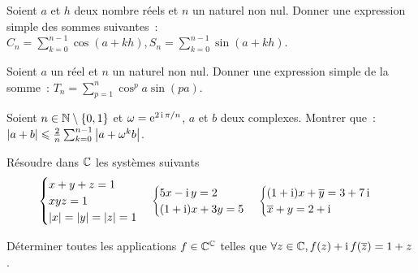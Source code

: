 \begin{exercice}
    Soient \(a\) et \(h\) deux nombre réels et \(n\) un naturel non nul. Donner 
    une expression simple des sommes suivantes~: \( C_n = \sum_{k=0}^{n-1} 
    \cos(a+kh), S_n = \sum_{k=0}^{n-1} \sin(a+kh)\).
\end{exercice}
\begin{exercice}
    Soient \(a\) un réel et \(n\) un naturel non nul. Donner une expression 
    simple de la somme~: \(T_n = \sum_{p=1}^n \cos^p a \sin(pa)\).
\end{exercice}
\begin{exercice}
    Soient \(n \in \mathbb{N}\setminus\{0,1\}\) et \(\omega = \operatorname{e}^{2\operatorname{i}\pi/n}\), \(a\) et 
    \(b\) deux complexes. Montrer que~: \(\left\lvert a+b\right\rvert \leqslant \frac{2}{n} 
    \sum_{k=0}^{n-1} \left\lvert a+\omega^k b\right\rvert\).
\end{exercice}
\begin{exercice}
    Résoudre dans \(\mathbb{C}\) les systèmes suivants
    \begin{equation}
        \begin{cases} x+y+z=1 \\ xyz=1 \\ \left\lvert x\right\rvert=\left\lvert y\right\rvert=\left\lvert z\right\rvert=1 \end{cases}
        \begin{cases} 5x-\operatorname{i}{}y=2 \\ (1+\operatorname{i})x+3y=5 \end{cases}
        \begin{cases} (1+\operatorname{i})x+\overline{y} = 3+7\operatorname{i} \\\overline{x}+y=2+\operatorname{i}\end{cases}
    \end{equation}
\end{exercice}
\begin{exercice}
    Déterminer toutes les applications \(f \in \mathbb{C}^{\mathbb{C}}\) telles que \(\forall z 
    \in \mathbb{C}, f(z)+\operatorname{i} f(\overline{z}) = 1+z\).
\end{exercice}
